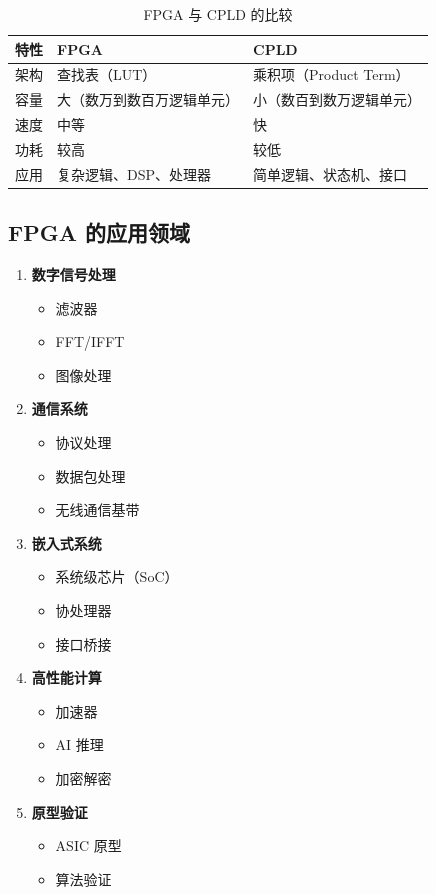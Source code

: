 \begin{table}[H]
  \centering
  \caption{FPGA 与 CPLD 的比较}
  \begin{tabular}{|l|l|l|}
    \hline
    特性 & FPGA & CPLD \\
    \hline
    架构 & 查找表（LUT） & 乘积项（Product Term） \\
    容量 & 大（数万到数百万逻辑单元） & 小（数百到数万逻辑单元） \\
    速度 & 中等 & 快 \\
    功耗 & 较高 & 较低 \\
    应用 & 复杂逻辑、DSP、处理器 & 简单逻辑、状态机、接口 \\
    \hline
  \end{tabular}
\end{table}

\subsection{FPGA 的应用领域}

\begin{enumerate}
  \item \textbf{数字信号处理}
    \begin{itemize}
      \item 滤波器
      \item FFT/IFFT
      \item 图像处理
    \end{itemize}

  \item \textbf{通信系统}
    \begin{itemize}
      \item 协议处理
      \item 数据包处理
      \item 无线通信基带
    \end{itemize}

  \item \textbf{嵌入式系统}
    \begin{itemize}
      \item 系统级芯片（SoC）
      \item 协处理器
      \item 接口桥接
    \end{itemize}

  \item \textbf{高性能计算}
    \begin{itemize}
      \item 加速器
      \item AI 推理
      \item 加密解密
    \end{itemize}

  \item \textbf{原型验证}
    \begin{itemize}
      \item ASIC 原型
      \item 算法验证
    \end{itemize}
\end{enumerate}

